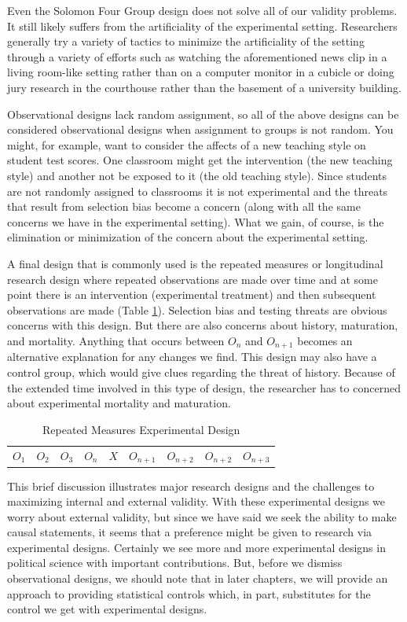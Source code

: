 \documentclass[11pt,openany]{book}\usepackage[]{graphicx}\usepackage[]{color}
\begin{document}
Even the Solomon Four Group design does not solve all of our validity problems. It still likely suffers from the artificiality of the experimental setting. Researchers generally try a variety of tactics to minimize the artificiality of the setting through a variety of efforts such as watching the aforementioned news clip in a living room-like setting rather than on a computer monitor in a cubicle or doing jury research in the courthouse rather than the basement of a university building.

Observational designs lack random assignment, so all of the above designs can be considered observational designs when assignment to groups is not random. You might, for example, want to consider the affects of a new teaching style on student test scores. One classroom might get the intervention (the new teaching style) and another not be exposed to it (the old teaching style). Since students are not randomly assigned to classrooms it is not experimental and the threats that result from selection bias become a concern (along with all the same concerns we have in the experimental setting). What we gain, of course, is the elimination or minimization of the concern about the experimental setting.

A final design that is commonly used is the repeated measures or longitudinal research design where repeated observations are made over time and at some point there is an intervention (experimental treatment) and then subsequent observations are made (Table \ref{tab:Experiment4}).  Selection bias and testing threats are obvious concerns with this design. But there are also concerns about history, maturation, and mortality. Anything that occurs between $O_n$ and $O_{n+1}$ becomes an alternative explanation for any changes we find. This design may also have a control group, which would give clues regarding the threat of history. Because of the extended time involved in this type of design, the researcher has to concerned about experimental mortality and maturation. 

\begin{table}[h]
\caption{Repeated Measures Experimental Design}
\label{tab:Experiment4}
\begin{tabular}{lllllllll}
$O_1$ & $O_2$ & $O_3$ & $O_n$ & $X$ & $O_{n+1}$ & $O_{n+2}$ & $O_{n+2}$ & $O_{n+3}$
\end{tabular}
\end{table}
\FloatBarrier

This brief discussion illustrates major research designs and the challenges to maximizing internal and external validity.  With these experimental designs we worry about external validity, but since we have said we seek the ability to make causal statements, it seems that a preference might be given to research via experimental designs. Certainly we see more and more experimental designs in political science with important contributions. But, before we dismiss observational designs, we should note that in later chapters, we will provide an approach to providing statistical controls which, in part, substitutes for the control we get with experimental designs. 
\end{document}
